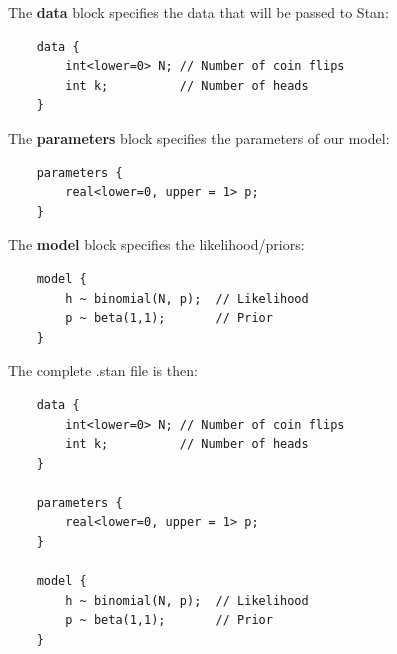 \documentclass{beamer}
\begin{document}
\begin{frame}[fragile]
The \textbf{data} block specifies the data that will be passed to Stan:
\begin{verbatim}
    data {
        int<lower=0> N; // Number of coin flips
        int k;          // Number of heads
    }
\end{verbatim}
\end{frame}

\begin{frame}[fragile]
The \textbf{parameters} block specifies the parameters of our model:
\begin{verbatim}
    parameters {
        real<lower=0, upper = 1> p;
    }
\end{verbatim}
\end{frame}

\begin{frame}[fragile]
The \textbf{model} block specifies the likelihood/priors:
\begin{verbatim}
    model {
        h ~ binomial(N, p);  // Likelihood
        p ~ beta(1,1);       // Prior
    }
\end{verbatim}
\end{frame}

\begin{frame}[fragile]
The complete .stan file is then:
\begin{verbatim}
    data {
        int<lower=0> N; // Number of coin flips
        int k;          // Number of heads
    }
    
    parameters {
        real<lower=0, upper = 1> p;
    }
    
    model {
        h ~ binomial(N, p);  // Likelihood
        p ~ beta(1,1);       // Prior
    }
\end{verbatim}
\end{frame}
\end{document}
